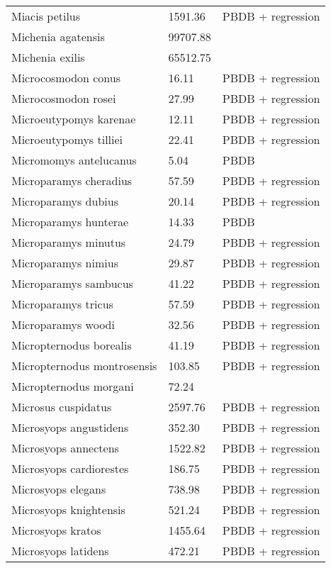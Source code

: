 \documentclass{article}
\begin{document}
\begin{center}
\begin{longtable}{p{} p{} p{}}
    Miacis petilus & 1591.36 & PBDB + regression \\ 
    Michenia agatensis & 99707.88 & \cite{Tomiya2013} \\ 
    Michenia exilis & 65512.75 & \cite{Tomiya2013} \\ 
    Microcosmodon conus & 16.11 & PBDB + regression \\ 
    Microcosmodon rosei & 27.99 & PBDB + regression \\ 
    Microeutypomys karenae & 12.11 & PBDB + regression \\ 
    Microeutypomys tilliei & 22.41 & PBDB + regression \\ 
    Micromomys antelucanus & 5.04 & PBDB \\ 
    Microparamys cheradius & 57.59 & PBDB + regression \\ 
    Microparamys dubius & 20.14 & PBDB + regression \\ 
    Microparamys hunterae & 14.33 & PBDB \\ 
    Microparamys minutus & 24.79 & PBDB + regression \\ 
    Microparamys nimius & 29.87 & PBDB + regression \\ 
    Microparamys sambucus & 41.22 & PBDB + regression \\ 
    Microparamys tricus & 57.59 & PBDB + regression \\ 
    Microparamys woodi & 32.56 & PBDB + regression \\ 
    Micropternodus borealis & 41.19 & PBDB + regression \\ 
    Micropternodus montrosensis & 103.85 & PBDB + regression \\ 
    Micropternodus morgani & 72.24 & \cite{Tomiya2013} \\ 
    Microsus cuspidatus & 2597.76 & PBDB + regression \\ 
    Microsyops angustidens & 352.30 & PBDB + regression \\ 
    Microsyops annectens & 1522.82 & PBDB + regression \\ 
    Microsyops cardiorestes & 186.75 & PBDB + regression \\ 
    Microsyops elegans & 738.98 & PBDB + regression \\ 
    Microsyops knightensis & 521.24 & PBDB + regression \\ 
    Microsyops kratos & 1455.64 & PBDB + regression \\ 
    Microsyops latidens & 472.21 & PBDB + regression \\ 

\end{longtable}
\end{center}
\end{document}
